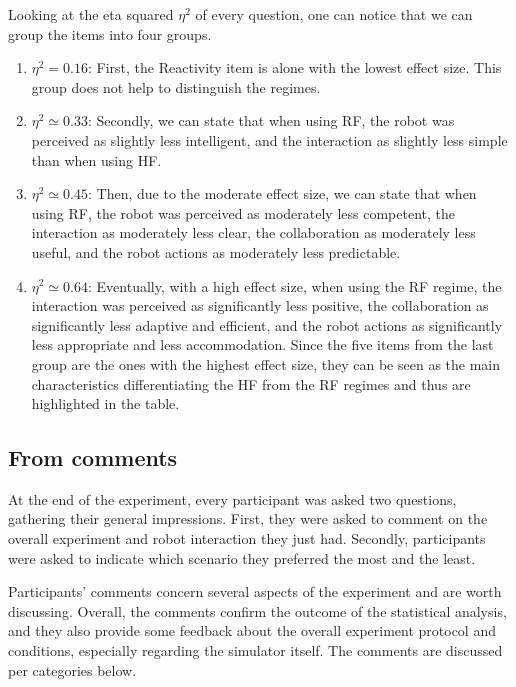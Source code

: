 Looking at the eta squared $\eta^2$ of every question, one can notice that we can group the items into four groups. 
\begin{enumerate}
    \item $\eta^2=0.16$: First, the Reactivity item is alone with the lowest effect size. This group does not help to distinguish the regimes. 
    \item $\eta^2 \simeq 0.33$: Secondly, we can state that when using RF, the robot was perceived as slightly less intelligent, and the interaction as slightly less simple than when using HF. 
    \item $\eta^2 \simeq 0.45$: Then, due to the moderate effect size, we can state that when using RF, the robot was perceived as moderately less competent, the interaction as moderately less clear, the collaboration as moderately less useful, and the robot actions as moderately less predictable. 
    \item $\eta^2 \simeq 0.64$: Eventually, with a high effect size, when using the RF regime, the interaction was perceived as significantly less positive, the collaboration as significantly less adaptive and efficient, and the robot actions as significantly less appropriate and less accommodation. Since the five items from the last group are the ones with the highest effect size, they can be seen as the main characteristics differentiating the HF from the RF regimes and thus are highlighted in the table.
\end{enumerate}

\subsection{From comments}

At the end of the experiment, every participant was asked two questions, gathering their general impressions. First, they were asked to comment on the overall experiment and robot interaction they just had. Secondly, participants were asked to indicate which scenario they preferred the most and the least. 

Participants' comments concern several aspects of the experiment and are worth discussing. Overall, the comments confirm the outcome of the statistical analysis, and they also provide some feedback about the overall experiment protocol and conditions, especially regarding the simulator itself. The comments are discussed per categories below. 


